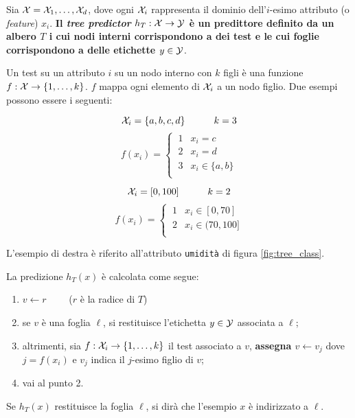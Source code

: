 Sia $ \mathcal{X} = \mathcal{X}_1,\dots,\mathcal{X}_d $, dove ogni $\mathcal{X}_i$ rappresenta il dominio dell'$i$-esimo
attributo (o \textit{feature}) $x_i$. \textbf{Il \textit{tree predictor} $h_T:\mathcal{X} 
\rightarrow \mathcal{Y}$ è un predittore definito da un albero $T$ i cui nodi interni 
corrispondono a dei test e le cui foglie corrispondono a delle etichette $y \in \mathcal{Y}$}.

Un test su un attributo $i$ su un nodo interno con $k$ figli è una funzione 
$f:\mathcal{X} \rightarrow \{1,\dots,k\}$. $f$ mappa ogni elemento di $\mathcal{X}_i$ a un nodo figlio. 
Due esempi possono essere i seguenti:

\begin{minipage}{.45\textwidth}
    $$\mathcal{X}_i = \{a,b,c,d\} \qquad\quad k=3$$
    $$ f(x_i) = 
        \begin{cases}
            \ 1 & x_i = c\\
            \ 2 & x_i = d\\
            \ 3 & x_i \in \{a,b\}\\
        \end{cases}
    $$
\end{minipage}
\begin{minipage}{.45\textwidth}
    $$\mathcal{X}_i = [0,100] \qquad\quad k=2$$
    $$ f(x_i) = 
        \begin{cases}
            \ 1 & x_i \in [0,70]\\
            \ 2 & x_i \in (70,100]\\
        \end{cases}
    $$
\end{minipage}

L'esempio di destra è riferito all'attributo \texttt{umidità} di figura
\ref{fig:tree_class}.

La predizione $h_T(x)$ è calcolata come segue:
\begin{enumerate}
    \item $v \leftarrow r \qquad$ ($r$ è la radice di $T$)
    \item se $v$ è una foglia $\ell$, si restituisce l'etichetta $y \in \mathcal{Y}$
    associata a $\ell$;
    \item altrimenti, sia $f:\mathcal{X}_i \rightarrow \{1,\dots,k\}$ il test associato a
    $v$, \textbf{assegna $v\leftarrow v_j$} dove $j=f(x_i)$ e $v_j$ indica il
    $j$-esimo figlio di $v$;
    \item vai al punto 2.
\end{enumerate}

Se $h_T(x)$ restituisce la foglia $\ell$, si dirà che l'esempio $x$ è indirizzato a
$\ell$.

